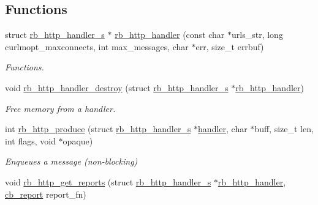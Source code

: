 \subsection*{Functions}
\begin{DoxyCompactItemize}
\item 
struct \hyperlink{structrb__http__handler__s}{rb\-\_\-http\-\_\-handler\-\_\-s} $\ast$ \hyperlink{librb-http_8h_a190d674d1d8cac12e0dd2445c5c8cba4}{rb\-\_\-http\-\_\-handler} (const char $\ast$urls\-\_\-str, long curlmopt\-\_\-maxconnects, int max\-\_\-messages, char $\ast$err, size\-\_\-t errbuf)
\begin{DoxyCompactList}\small\item\em Functions. \end{DoxyCompactList}\item 
void \hyperlink{librb-http_8h_a57eb6a7b4fba5c589b2a4afbb61f314c}{rb\-\_\-http\-\_\-handler\-\_\-destroy} (struct \hyperlink{structrb__http__handler__s}{rb\-\_\-http\-\_\-handler\-\_\-s} $\ast$\hyperlink{rb__http__handler_8c_a68c2a5bd671ddb123e3f38057b5c45f6}{rb\-\_\-http\-\_\-handler})
\begin{DoxyCompactList}\small\item\em Free memory from a handler. \end{DoxyCompactList}\item 
int \hyperlink{librb-http_8h_a6f4b97a63ef87f1f51176db8947ab907}{rb\-\_\-http\-\_\-produce} (struct \hyperlink{structrb__http__handler__s}{rb\-\_\-http\-\_\-handler\-\_\-s} $\ast$\hyperlink{rb__http__handler__example_8c_a0165697b451a136ac74647662a5a39e1}{handler}, char $\ast$buff, size\-\_\-t len, int flags, void $\ast$opaque)
\begin{DoxyCompactList}\small\item\em Enqueues a message (non-\/blocking) \end{DoxyCompactList}\item 
void \hyperlink{librb-http_8h_aa9121154f5242572bfbc47fca33c1310}{rb\-\_\-http\-\_\-get\-\_\-reports} (struct \hyperlink{structrb__http__handler__s}{rb\-\_\-http\-\_\-handler\-\_\-s} $\ast$\hyperlink{rb__http__handler_8c_a68c2a5bd671ddb123e3f38057b5c45f6}{rb\-\_\-http\-\_\-handler}, \hyperlink{librb-http_8h_a04bb44224e2874cbf2df16042f2a4c53}{cb\-\_\-report} report\-\_\-fn)
\end{DoxyCompactItemize}



